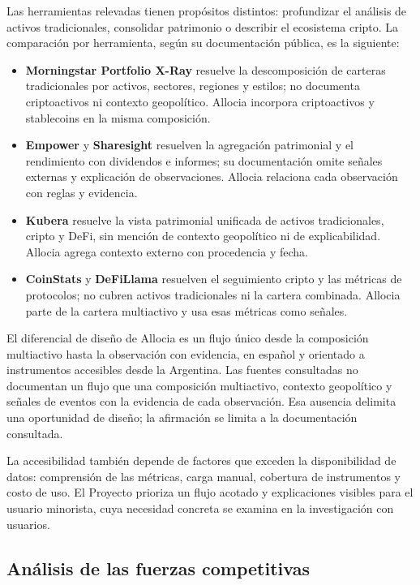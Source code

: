 Las herramientas relevadas tienen propósitos distintos: profundizar el análisis de activos tradicionales, consolidar patrimonio o describir el ecosistema cripto. La comparación por herramienta, según su documentación pública, es la siguiente:
\begin{itemize}
\item \textbf{Morningstar Portfolio X-Ray} resuelve la descomposición de carteras tradicionales por activos, sectores, regiones y estilos; no documenta criptoactivos ni contexto geopolítico. Allocia incorpora criptoactivos y stablecoins en la misma composición.
\item \textbf{Empower} y \textbf{Sharesight} resuelven la agregación patrimonial y el rendimiento con dividendos e informes; su documentación omite señales externas y explicación de observaciones. Allocia relaciona cada observación con reglas y evidencia.
\item \textbf{Kubera} resuelve la vista patrimonial unificada de activos tradicionales, cripto y DeFi, sin mención de contexto geopolítico ni de explicabilidad. Allocia agrega contexto externo con procedencia y fecha.
\item \textbf{CoinStats} y \textbf{DeFiLlama} resuelven el seguimiento cripto y las métricas de protocolos; no cubren activos tradicionales ni la cartera combinada. Allocia parte de la cartera multiactivo y usa esas métricas como señales.
\end{itemize}
El diferencial de diseño de Allocia es un flujo único desde la composición multiactivo hasta la observación con evidencia, en español y orientado a instrumentos accesibles desde la Argentina. Las fuentes consultadas no documentan un flujo que una composición multiactivo, contexto geopolítico y señales de eventos con la evidencia de cada observación. Esa ausencia delimita una oportunidad de diseño; la afirmación se limita a la documentación consultada.

La accesibilidad también depende de factores que exceden la disponibilidad de datos: comprensión de las métricas, carga manual, cobertura de instrumentos y costo de uso. El Proyecto prioriza un flujo acotado y explicaciones visibles para el usuario minorista, cuya necesidad concreta se examina en la investigación con usuarios.

\subsection{Análisis de las fuerzas competitivas}\label{subsec:porter}

